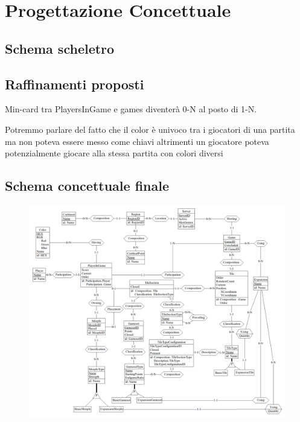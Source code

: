 \section{Progettazione Concettuale}
\subsection{Schema scheletro}

\subsection{Raffinamenti proposti}
Min-card tra PlayersInGame e games diventerà 0-N al posto di 1-N.
\medskip

Potremmo parlare del fatto che il color è univoco tra i giocatori di una partita ma non poteva essere messo come chiavi altrimenti un giocatore poteva potenzialmente giocare alla stessa partita con colori diversi

\subsection{Schema concettuale finale}
\clearpage
\begin{figure}[ht]
    \centerline{\includegraphics[scale=0.375]{images/Progettazione/Concettuale/modello.png}}
\end{figure}